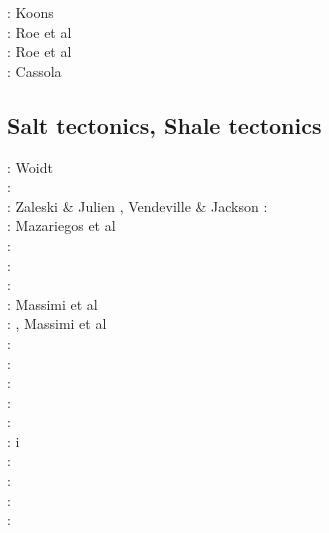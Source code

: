 \begin{scriptsize}
\nineteenninetyfour: Koons \cite{koon94}\\
\twothousandsix: Roe et al \cite{rosw06}\\
\twothousandeight: Roe et al \cite{rowf08}\\
\twothousandthirteen: Cassola \cite{cass13}
\end{scriptsize}


\subsection{Salt tectonics, Shale tectonics}

\begin{scriptsize}
\nineteenseventyeight: Woidt \cite{woid78}\\
\nineteenninetyone: \cite{tars91}\\
\nineteenninetytwo: Zaleski \& Julien \cite{zaju92},  Vendeville \& Jackson \cite{veja92}
\nineteenninetythree: \cite{nabr93}\cite{vasv93}\cite{wejv93}\cite{wein93}\\
\nineteenninetysix: Mazariegos et al \cite{maar96}\\
\nineteenninetyeight: \cite{giju98}\\
\twothousandfour: \cite{istt04}\cite{geim04}\cite{mcmg04}\\
\twothousandfive: \cite{gebi05}\\
\twothousandsix: Massimi et al \cite{maqs06}\\
\twothousandseven: \cite{huja07}, Massimi et al \cite{maqs07}\\
\twothousandnine: \cite{grba09}\\
\twothousandten: \cite{albe10}\cite{albi10}\cite{inbe10}\cite{inbe10b}\cite{albs10}\\
\twothousandeleven: \cite{brfo11}\\
\twothousandtwelve: \cite{fejr12}\cite{liqi12}\cite{grbe12}\cite{albe12}\cite{grbi12}\cite{goib12}\cite{rukb12}\\
\twothousandthirteen: \cite{gobi13}\cite{nipc13}\\
\twothousandfourteen: \cite{bakp14}\cite{feka14a}\cite{feka14b}\cite{ghbu14}\cite{nifh14}i\cite{peel14}\\
\twothousandfifteen: \cite{feka15}\cite{cofk15}\\
\twothousandsixteen: \cite{masg16}\cite{albe16}\\
\twothousandseventeen: \cite{grbe17}\cite{henf17}\\
\twothousandnineteen: \cite{hadv19}\cite{clcc19}
\end{scriptsize}

